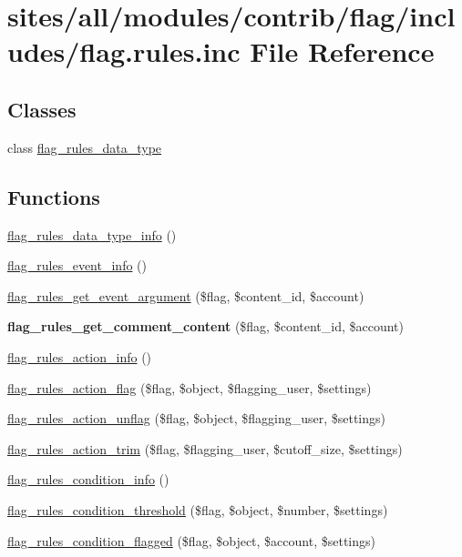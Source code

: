 \hypertarget{flag_8rules_8inc}{
\section{sites/all/modules/contrib/flag/includes/flag.rules.inc File Reference}
\label{flag_8rules_8inc}
}
\subsection*{Classes}
\begin{CompactItemize}
\item 
class \hyperlink{classflag__rules__data__type}{flag\_\-rules\_\-data\_\-type}
\end{CompactItemize}
\subsection*{Functions}
\begin{CompactItemize}
\item 
\hyperlink{group__rules_g79d47f2b9589f76b339066ca3d6dee1e}{flag\_\-rules\_\-data\_\-type\_\-info} ()
\item 
\hyperlink{flag_8rules_8inc_f4819490ed1f860605a31544ab188855}{flag\_\-rules\_\-event\_\-info} ()
\item 
\hyperlink{flag_8rules_8inc_fa153ce513fb7e21a85f35bda9d730dd}{flag\_\-rules\_\-get\_\-event\_\-argument} (\$flag, \$content\_\-id, \$account)
\item 
\hypertarget{flag_8rules_8inc_5f4c799ec32420802d0894aaa191d147}{
\textbf{flag\_\-rules\_\-get\_\-comment\_\-content} (\$flag, \$content\_\-id, \$account)}
\label{flag_8rules_8inc_5f4c799ec32420802d0894aaa191d147}

\item 
\hyperlink{flag_8rules_8inc_0e96be6705a5b3a0ffee87553491c831}{flag\_\-rules\_\-action\_\-info} ()
\item 
\hyperlink{flag_8rules_8inc_f1ae8e72fd6b91d64a2813620ec2a37c}{flag\_\-rules\_\-action\_\-flag} (\$flag, \$object, \$flagging\_\-user, \$settings)
\item 
\hyperlink{flag_8rules_8inc_4b6594e3196980112aa2c66bf9c01aee}{flag\_\-rules\_\-action\_\-unflag} (\$flag, \$object, \$flagging\_\-user, \$settings)
\item 
\hyperlink{flag_8rules_8inc_30f73bf152c69a689ab7ebed25aed70d}{flag\_\-rules\_\-action\_\-trim} (\$flag, \$flagging\_\-user, \$cutoff\_\-size, \$settings)
\item 
\hyperlink{flag_8rules_8inc_ff1b49547204500da520d93710e5b8a5}{flag\_\-rules\_\-condition\_\-info} ()
\item 
\hyperlink{flag_8rules_8inc_2c2dcf4a344e8af58b1fa3d1c101c3db}{flag\_\-rules\_\-condition\_\-threshold} (\$flag, \$object, \$number, \$settings)
\item 
\hyperlink{flag_8rules_8inc_e7df524a480d9efa4d45cbbb5c553b77}{flag\_\-rules\_\-condition\_\-flagged} (\$flag, \$object, \$account, \$settings)
\end{CompactItemize}


